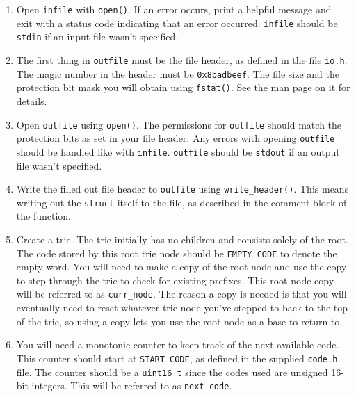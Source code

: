 \documentclass{article}
\begin{document}
\begin{enumerate}
    \item Open \texttt{infile} with \texttt{open()}. If an error occurs, print a
        helpful message and exit with a status code indicating that an error
        occurred. \texttt{infile} should be \texttt{stdin} if an input file
        wasn't specified.

    \item The first thing in \texttt{outfile} must be the file header, as
        defined in the file \texttt{io.h}. The magic number in the header must
        be \texttt{0x8badbeef}. The file size and the protection bit mask you
        will obtain using \texttt{fstat()}. See the man page on it for details.

    \item Open \texttt{outfile} using \texttt{open()}. The permissions for
        \texttt{outfile} should match the protection bits as set in your file
        header. Any errors with opening \texttt{outfile} should be handled like
        with \texttt{infile}. \texttt{outfile} should be \texttt{stdout} if an
        output file wasn't specified.

    \item Write the filled out file header to \texttt{outfile} using
        \texttt{write\_header()}. This means writing out the \texttt{struct}
        itself to the file, as described in the comment block of the function.

    \item Create a trie. The trie initially has no children and consists solely
        of the root. The code stored by this root trie node should be
        \texttt{EMPTY\_CODE} to denote the empty word. You will need to make a
        copy of the root node and use the copy to step through the trie to check
        for existing prefixes. This root node copy will be referred to as
        \texttt{curr\_node}. The reason a copy is needed is that you will
        eventually need to reset whatever trie node you've stepped to back to
        the top of the trie, so using a copy lets you use the root node as a
        base to return to.

    \item You will need a monotonic counter to keep track of the next available
        code. This counter should start at \texttt{START\_CODE}, as defined in
        the supplied \texttt{code.h} file. The counter should be a
        \texttt{uint16\_t} since the codes used are unsigned 16-bit integers.
        This will be referred to as \texttt{next\_code}.


\end{enumerate}
\end{document}
